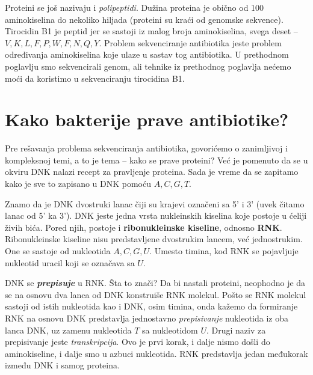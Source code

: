 Proteini se još nazivaju i \textit{polipeptidi}. Dužina proteina je obično od 100 aminokiselina do nekoliko hiljada (proteini su kraći od genomske sekvence). Tirocidin B1 je peptid jer se sastoji iz malog broja aminokiselina, svega deset -- $ V,K,L,F,P,W,F,N,Q,Y$. Problem sekvenciranje antibiotika jeste problem određivanja aminokiselina koje ulaze u sastav tog antibiotika. U prethodnom poglavlju smo sekvencirali genom, ali tehnike iz prethodnog poglavlja nećemo moći da koristimo u sekvenciranju tirocidina B1.


\section{Kako bakterije prave antibiotike?}

Pre rešavanja problema sekvenciranja antibiotika, govorićemo o zanimljivoj i kompleksnoj temi, a to je tema -- kako se prave proteini? Već je pomenuto da se u okviru DNK nalazi recept za pravljenje proteina. Sada je vreme da se zapitamo kako je sve to zapisano u DNK pomoću $A, C, G, T$.

Znamo da je DNK dvostruki lanac čiji su krajevi označeni sa 5' i 3' (uvek čitamo lanac od 5' ka 3'). DNK jeste jedna vrsta nukleinskih kiselina koje postoje u ćeliji živih bića. Pored njih, postoje i \textbf{ribonukleinske kiseline}, odnosno \textbf{RNK}. Ribonukleinske kiseline nisu predstavljene dvostrukim lancem, već jednostrukim. One se sastoje od nukleotida $A, C, G, U$. Umesto timina, kod RNK se pojavljuje nukleotid uracil koji se označava sa $U$. 

DNK se \textbf{\textit{prepisuje}} u RNK. Šta to znači? Da bi nastali proteini, neophodno je da se na osnovu dva lanca od DNK konstruiše RNK molekul. Pošto se RNK molekul sastoji od istih nukleotida kao i DNK, osim timina, onda kažemo da formiranje RNK na osnovu DNK predstavlja jednostavno \textit{prepisivanje} nukleotida iz oba lanca DNK, uz zamenu nukleotida $T$ sa nukleotidom $U$. Drugi naziv za prepisivanje jeste \textit{transkripcija}. Ovo je prvi korak, i dalje nismo došli do aminokiseline, i dalje smo u azbuci nukleotida. RNK predstavlja jedan međukorak između DNK i samog proteina.

